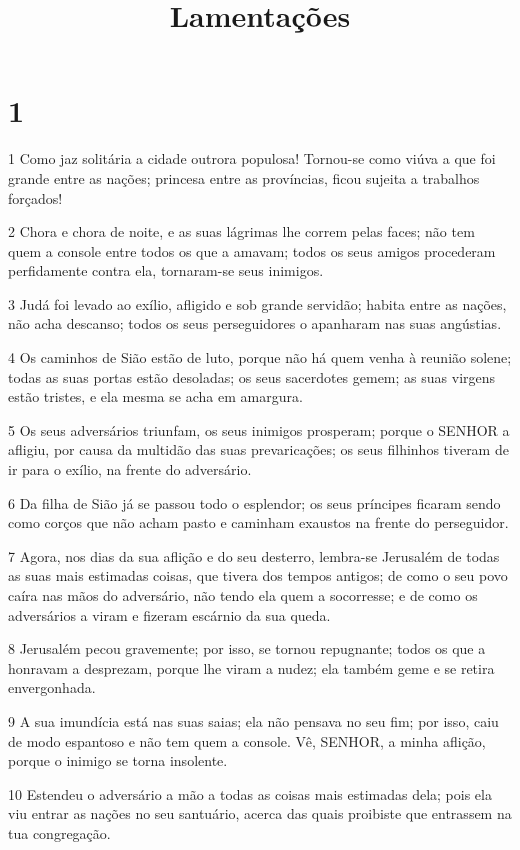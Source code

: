 

\title{Lamentações}


\chapter{1}

\par 1 Como jaz solitária a cidade outrora populosa! Tornou-se como viúva a que foi grande entre as nações; princesa entre as províncias, ficou sujeita a trabalhos forçados!
\par 2 Chora e chora de noite, e as suas lágrimas lhe correm pelas faces; não tem quem a console entre todos os que a amavam; todos os seus amigos procederam perfidamente contra ela, tornaram-se seus inimigos.
\par 3 Judá foi levado ao exílio, afligido e sob grande servidão; habita entre as nações, não acha descanso; todos os seus perseguidores o apanharam nas suas angústias.
\par 4 Os caminhos de Sião estão de luto, porque não há quem venha à reunião solene; todas as suas portas estão desoladas; os seus sacerdotes gemem; as suas virgens estão tristes, e ela mesma se acha em amargura.
\par 5 Os seus adversários triunfam, os seus inimigos prosperam; porque o SENHOR a afligiu, por causa da multidão das suas prevaricações; os seus filhinhos tiveram de ir para o exílio, na frente do adversário.
\par 6 Da filha de Sião já se passou todo o esplendor; os seus príncipes ficaram sendo como corços que não acham pasto e caminham exaustos na frente do perseguidor.
\par 7 Agora, nos dias da sua aflição e do seu desterro, lembra-se Jerusalém de todas as suas mais estimadas coisas, que tivera dos tempos antigos; de como o seu povo caíra nas mãos do adversário, não tendo ela quem a socorresse; e de como os adversários a viram e fizeram escárnio da sua queda.
\par 8 Jerusalém pecou gravemente; por isso, se tornou repugnante; todos os que a honravam a desprezam, porque lhe viram a nudez; ela também geme e se retira envergonhada.
\par 9 A sua imundícia está nas suas saias; ela não pensava no seu fim; por isso, caiu de modo espantoso e não tem quem a console. Vê, SENHOR, a minha aflição, porque o inimigo se torna insolente.
\par 10 Estendeu o adversário a mão a todas as coisas mais estimadas dela; pois ela viu entrar as nações no seu santuário, acerca das quais proibiste que entrassem na tua congregação.
